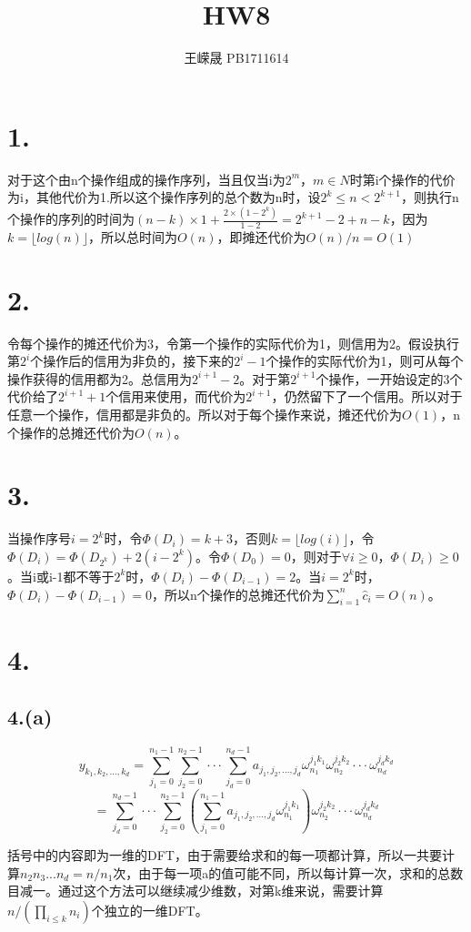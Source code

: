 \documentclass{article}
\title{HW8}
\author{王嵘晟 \quad PB1711614}
\date{}
\begin{document}
	\maketitle
	\section*{1.}
	\par{对于这个由n个操作组成的操作序列，当且仅当i为$2^{m}$，$m\in N$时第i个操作的代价为i，其他代价为1.所以这个操作序列的总个数为n时，设$2^{k}\le n< 2^{k+1}$，则执行n个操作的序列的时间为$(n-k)\times1+\frac{2\times(1-2^{k})}{1-2}=2^{k+1}-2+n-k$，因为$k=\lfloor log(n)\rfloor$，所以总时间为$O(n)$，即摊还代价为$O(n)/n=O(1)$}
	\section*{2.}
	\par{令每个操作的摊还代价为3，令第一个操作的实际代价为1，则信用为2。假设执行第$2^{i}$个操作后的信用为非负的，接下来的$2^{i}-1$个操作的实际代价为1，则可从每个操作获得的信用都为2。总信用为$2^{i+1}-2$。对于第$2^{i+1}$个操作，一开始设定的3个代价给了$2^{i+1}+1$个信用来使用，而代价为$2^{i+1}$，仍然留下了一个信用。所以对于任意一个操作，信用都是非负的。所以对于每个操作来说，摊还代价为$O(1)$，n个操作的总摊还代价为$O(n)$。}
	\section*{3.}
	\par{当操作序号$i=2^{k}$时，令$\Phi(D_{i})=k+3$，否则$k=\lfloor log(i)\rfloor$，令$\Phi(D_{i})=\Phi(D_{2^{k}})+2(i-2^{k})$。令$\Phi(D_{0})=0$，则对于$\forall i\ge0$，$\Phi(D_{i})\ge0$。当i或i-1都不等于$2^{k}$时，$\Phi(D_{i})-\Phi(D_{i-1})=2$。当$i=2^{k}$时，$\Phi(D_{i})-\Phi(D_{i-1})=0$，所以n个操作的总摊还代价为$\sum_{i=1}^{n}\hat{c}_{i}=O(n)$。}
	\section*{4.}
	\subsection*{4.(a)}
	$$y_{k_{1},k_{2},...,k_{d}}=\sum_{j_{1}=0}^{n_{1}-1}\sum_{j_{2}=0}^{n_{2}-1}···\sum_{j_{d}=0}^{n_{d}-1}a_{j_{1},j_{2},...,j_{d}}\omega_{n_{1}}^{j_{1}k_{1}}\omega_{n_{2}}^{j_{2}k_{2}}···\omega_{n_{d}}^{j_{d}k_{d}}$$
	$$=\sum_{j_{d}=0}^{n_{d}-1}···\sum_{j_{2}=0}^{n_{2}-1}(\sum_{j_{1}=0}^{n_{1}-1}a_{j_{1},j_{2},...,j_{d}}\omega_{n_{1}}^{j_{1}k_{1}})\omega_{n_{2}}^{j_{2}k_{2}}···\omega_{n_{d}}^{j_{d}k_{d}}$$
	\par{括号中的内容即为一维的DFT，由于需要给求和的每一项都计算，所以一共要计算$n_{2}n_{3}...n_{d}=n/n_{1}$次，由于每一项a的值可能不同，所以每计算一次，求和的总数目减一。通过这个方法可以继续减少维数，对第k维来说，需要计算$n/(\prod_{i\le k}^{}n_{i})$个独立的一维DFT。}
\end{document}
